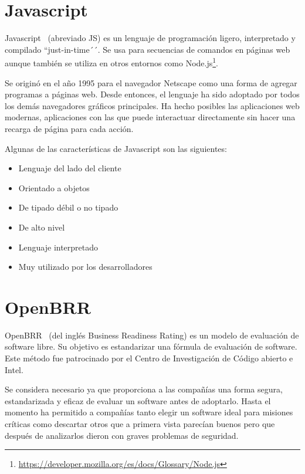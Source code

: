 \documentclass[a4paper, 12pt]{book}
\begin{document}
\section{Javascript}
\label{sec:Javascript}

Javascript~\cite{website:Javascript} (abreviado JS) es un lenguaje de programación ligero, interpretado y compilado ``just-in-time´´. Se usa para secuencias de comandos en páginas web aunque también se utiliza en otros entornos como Node.js\footnote{\url{https://developer.mozilla.org/es/docs/Glossary/Node.js}}.

Se originó en el año 1995 para el navegador Netscape como una forma de agregar programas a páginas web. Desde entonces, el lenguaje ha sido adoptado por todos los demás navegadores gráficos principales. Ha hecho posibles las aplicaciones web modernas, aplicaciones con las que puede interactuar directamente sin hacer una recarga de página para cada acción.

Algunas de las características de Javascript son las siguientes:

\begin{itemize}
	\item Lenguaje del lado del cliente
	\item Orientado a objetos
	\item De tipado débil o no tipado
	\item De alto nivel
	\item Lenguaje interpretado
	\item Muy utilizado por los desarrolladores\\
\end{itemize}

\section{OpenBRR}
\label{sec:openbrr}

OpenBRR~\cite{website:OpenBRR} (del inglés Business Readiness Rating) es un modelo de evaluación de software libre. Su objetivo es estandarizar una fórmula de evaluación de software. Este método fue patrocinado por el Centro de Investigación de Código abierto e Intel.

Se considera necesario ya que proporciona a las compañías una forma segura, estandarizada y eficaz de evaluar un software antes de adoptarlo. Hasta el momento ha permitido a compañías tanto elegir un software ideal para misiones críticas como descartar otros que a primera vista parecían buenos pero que después de analizarlos dieron con graves problemas de seguridad.
\end{document}

